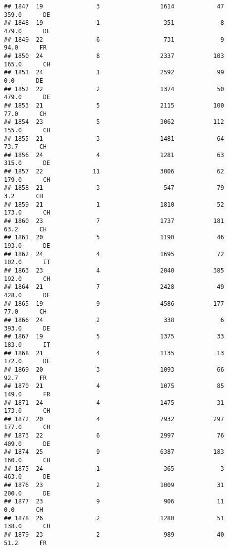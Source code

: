 \documentclass[
]{article}
\begin{document}
\begin{verbatim}
## 1847  19               3                 1614            47    359.0      DE
## 1848  19               1                  351             8    479.0      DE
## 1849  22               6                  731             9     94.0      FR
## 1850  24               8                 2337           103    165.0      CH
## 1851  24               1                 2592            99      0.0      DE
## 1852  22               2                 1374            50    479.0      DE
## 1853  21               5                 2115           100     77.0      CH
## 1854  23               5                 3062           112    155.0      CH
## 1855  21               3                 1481            64     73.7      CH
## 1856  24               4                 1281            63    315.0      DE
## 1857  22              11                 3006            62    179.0      CH
## 1858  21               3                  547            79      3.2      CH
## 1859  21               1                 1810            52    173.0      CH
## 1860  23               7                 1737           181     63.2      CH
## 1861  20               5                 1190            46    193.0      DE
## 1862  24               4                 1695            72    102.0      IT
## 1863  23               4                 2040           385    192.0      CH
## 1864  21               7                 2428            49    428.0      DE
## 1865  19               9                 4586           177     77.0      CH
## 1866  24               2                  338             6    393.0      DE
## 1867  19               5                 1375            33    183.0      IT
## 1868  21               4                 1135            13    172.0      DE
## 1869  20               3                 1093            66     92.7      FR
## 1870  21               4                 1075            85    149.0      FR
## 1871  24               4                 1475            31    173.0      CH
## 1872  20               4                 7932           297    177.0      CH
## 1873  22               6                 2997            76    409.0      DE
## 1874  25               9                 6387           183    160.0      CH
## 1875  24               1                  365             3    463.0      DE
## 1876  23               2                 1009            31    200.0      DE
## 1877  23               9                  906            11      0.0      CH
## 1878  26               2                 1280            51    138.0      CH
## 1879  23               2                  989            40     51.2      FR

\end{verbatim}
\end{document}
